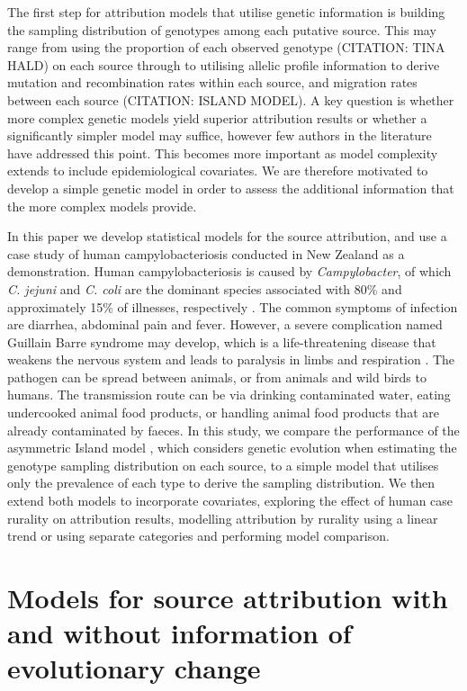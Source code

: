 \documentclass[times, doublespace]{WileyNJD-v2}%
\begin{document}
The first step for attribution models that utilise genetic information is building the sampling distribution of genotypes among each putative source. This may range from using the proportion of each observed genotype (CITATION: TINA HALD) on each source through to utilising allelic profile information to derive mutation and recombination rates within each source, and migration rates between each source (CITATION: ISLAND MODEL). A key question is whether more complex genetic models yield superior attribution results or whether a significantly simpler model may suffice, however few authors in the literature have addressed this point. This becomes more important as model complexity extends to include epidemiological covariates. We are therefore motivated to develop a simple genetic model in order to assess the additional information that the more complex models provide.

In this paper we develop statistical models for the source attribution, and use a case study of human campylobacteriosis conducted in New Zealand \cite{Marsh} as a demonstration. Human campylobacteriosis is caused by \textit{Campylobacter}, of which \textit{C. jejuni} and \textit{C. coli} are the dominant species associated with 80\% and approximately 15\% of illnesses, respectively \cite{Guert}. The common symptoms of infection are diarrhea, abdominal pain and fever. However, a severe complication named Guillain Barre syndrome may develop, which is a life-threatening disease that weakens the nervous system and leads to paralysis in limbs and respiration \cite{Hanha}. The pathogen can be spread between animals, or from animals and wild birds to humans. The transmission route can be via drinking contaminated water, eating undercooked animal food products, or handling animal food products that are already contaminated by faeces. In this study, we compare the performance of the asymmetric Island model \cite{Wilso}, which considers genetic evolution when estimating the genotype sampling distribution on each source, to a simple model that utilises only the prevalence of each type to derive the sampling distribution. We then extend both models to incorporate covariates, exploring the effect of human case rurality on attribution results, modelling attribution by rurality using a linear trend or using separate categories and performing model comparison.

\section{Models for source attribution with and without information of evolutionary change}
\end{document}
